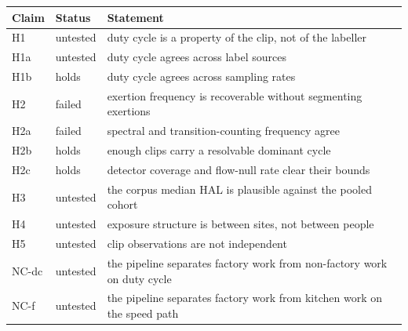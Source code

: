 \begin{tabular}{@{}llp{9.2cm}@{}}
\toprule
Claim & Status & Statement \\
\midrule
H1 & untested & duty cycle is a property of the clip, not of the labeller \\
H1a & untested & duty cycle agrees across label sources \\
H1b & holds & duty cycle agrees across sampling rates \\
H2 & failed & exertion frequency is recoverable without segmenting exertions \\
H2a & failed & spectral and transition-counting frequency agree \\
H2b & holds & enough clips carry a resolvable dominant cycle \\
H2c & holds & detector coverage and flow-null rate clear their bounds \\
H3 & untested & the corpus median HAL is plausible against the pooled cohort \\
H4 & untested & exposure structure is between sites, not between people \\
H5 & untested & clip observations are not independent \\
NC-dc & untested & the pipeline separates factory work from non-factory work on duty cycle \\
NC-f & untested & the pipeline separates factory work from kitchen work on the speed path \\
\bottomrule
\end{tabular}
